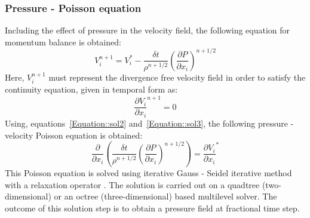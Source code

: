 \subsubsection{Pressure - Poisson equation}
Including the effect of pressure in the velocity field, the following equation for momentum balance is obtained:
\begin{equation}\label{Equation::sol2}
V_i^{n+1} = V_i^* - \frac{\delta t}{\rho^{n+1/2}}\left(\frac{\partial P}{\partial x_i}\right)^{n+1/2}
\end{equation}
Here, $V_i^{n+1}$ must represent the divergence free velocity field in order to satisfy the continuity equation, given in temporal form as:
\begin{equation}\label{Equation::sol3}
\frac{\partial V_i}{\partial x_i}^{n+1} = 0
\end{equation}
Using, equations~\ref{Equation::sol2} and~\ref{Equation::sol3}, the following pressure - velocity Poisson equation is obtained:
\begin{equation}\label{Equation::sol4}
\frac{\partial}{\partial x_i}\left(\frac{\delta t}{\rho^{n+1/2}}\left(\frac{\partial P}{\partial x_i}\right)^{n+1/2}\right) = \frac{\partial V_i}{\partial x_i}^*
\end{equation}
This Poisson equation is solved using iterative Gauss - Seidel iterative method with a relaxation operator \citep{Popinet2003}. The solution is carried out on a quadtree (two-dimensional) or an octree (three-dimensional) based multilevel solver. The outcome of this solution step is to obtain a pressure field at fractional time step.
